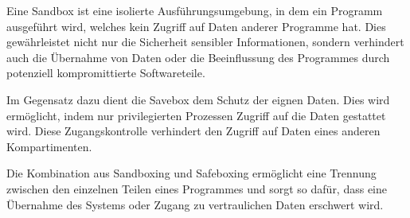 Eine Sandbox ist eine isolierte Ausführungsumgebung, in dem ein Programm ausgeführt wird, welches kein Zugriff auf Daten anderer Programme hat. Dies gewährleistet nicht nur die Sicherheit sensibler Informationen, sondern verhindert auch die Übernahme von Daten oder die Beeinflussung des Programmes durch potenziell kompromittierte Softwareteile.

Im Gegensatz dazu dient die Savebox dem Schutz der eignen Daten. Dies wird ermöglicht, indem nur privilegierten Prozessen Zugriff auf die Daten gestattet wird. Diese Zugangskontrolle verhindert den Zugriff auf Daten eines anderen Kompartimenten. 

Die Kombination aus Sandboxing und Safeboxing ermöglicht eine Trennung zwischen den einzelnen Teilen eines Programmes und sorgt so dafür, dass eine Übernahme des Systems oder Zugang zu vertraulichen Daten erschwert wird.
